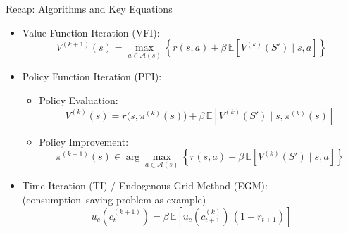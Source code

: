 \documentclass[aspectratio=169]{beamer}
\newcommand{\1}{\mathbf{1}}
\begin{document}
\begin{frame}{Recap: Algorithms and Key Equations}
\small
\begin{itemize}\setlength{\itemsep}{2mm}
    \item Value Function Iteration (VFI):
    \[
        V^{(k+1)}(s)
        = \max_{a \in \mathcal{A}(s)}
        \left\{ r(s,a) + \beta\,\mathbb{E}\left[ V^{(k)}(S') \mid s,a \right] \right\}
    \]

    \item Policy Function Iteration (PFI):
    \begin{itemize}\setlength{\itemsep}{1mm}
        \item Policy Evaluation:
        \[
            V^{(k)}(s)
            = r\big(s,\pi^{(k)}(s)\big)
            + \beta\,\mathbb{E}\left[ V^{(k)}(S') \mid s,\pi^{(k)}(s) \right]
        \]
        \item Policy Improvement:
        \[
            \pi^{(k+1)}(s)
            \in \arg\max_{a \in \mathcal{A}(s)}
            \left\{ r(s,a) + \beta\,\mathbb{E}\left[ V^{(k)}(S') \mid s,a \right] \right\}
        \]
    \end{itemize}

    \item Time Iteration (TI) / Endogenous Grid Method (EGM): \\
    (consumption–saving problem as example)
    \[
        u_c(c^{(k+1)}_t)
        = \beta \,\mathbb{E}\left[
            u_c(c^{(k)}_{t+1}) \, (1 + r_{t+1})
        \right]
    \]
\end{itemize}
\end{frame}
\end{document}
